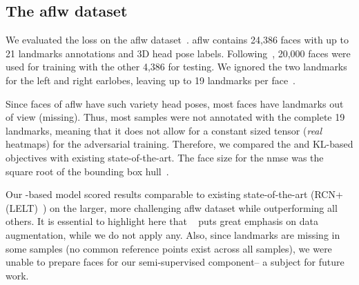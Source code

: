 \documentclass[10pt,twocolumn,letterpaper]{article}
\begin{document}
\subsection{The \gls{aflw} dataset}
We evaluated the  loss on the \gls{aflw} dataset~\cite{koestinger2011annotated}. \gls{aflw} contains 24,386 faces with up to 21 landmarks annotations and 3D head pose labels. Following~\cite{honari2018improving}, 20,000 faces were used for training with the other 4,386 for testing. We ignored the two landmarks for the left and right earlobes, leaving up to 19 landmarks per face~\cite{dong2018supervision}.


Since faces of \gls{aflw} have such variety head poses, most faces have landmarks out of view (\ie missing). Thus, most samples were not annotated with the complete 19 landmarks, meaning that it does not allow for a constant sized tensor (\ie \textit{real} heatmaps) for the adversarial training. Therefore, we compared the  and KL-based objectives with existing state-of-the-art. The face size  for the \gls{nmse} was the square root of the bounding box hull~\cite{bulat2017far}. 


Our -based model scored results comparable to existing state-of-the-art (\ie RCN+ (LELT)~\cite{honari2018improving}) on the larger, more challenging \gls{aflw} dataset while outperforming all others. It is essential to highlight here that ~\cite{honari2018improving} puts great emphasis on data augmentation, while we do not apply any. Also, since landmarks are missing in some samples (\ie no common reference points exist across all samples), we were unable to prepare faces for our semi-supervised component-- a subject for future work.
\end{document}
